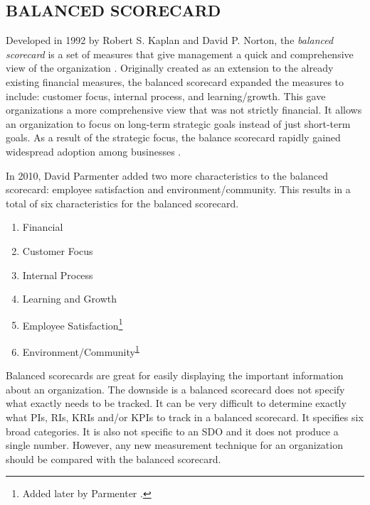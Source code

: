 \documentclass[SDSUThesis.tex]{subfiles}
\begin{document}
    \subsection{BALANCED SCORECARD}
    \label{sec:bsc}
    
        Developed in 1992 by Robert S. Kaplan and David P. Norton, the 
        \textit{balanced scorecard}  is a set of measures that
        give management a quick and comprehensive view of the
        organization \cite{kaplan1992}.  Originally created as an
        extension to the already existing financial measures, the
        balanced scorecard expanded the measures to include: 
        customer focus, internal process, and learning/growth. 
        This gave organizations a more comprehensive view that was
        not strictly financial.  It allows an organization to focus
        on long-term strategic goals instead of just short-term goals.
        As a result of the strategic focus, the balance scorecard
        rapidly gained widespread adoption
        among businesses \cite{Kaplan2007}.  
        
        In 2010, David Parmenter \cite{parmenter2010} added two more
        characteristics to the balanced scorecard: employee satisfaction
        and environment/community.  This results in a total of six 
        characteristics for the balanced scorecard.
        \begin{enumerate}
          \item Financial 
          \item Customer Focus
          \item Internal Process
          \item Learning and Growth
          \item Employee Satisfaction\footnote{\label{ft:bsc} Added 
          later by Parmenter \cite{parmenter2010}. }
          \item Environment/Community\textsuperscript{\ref{ft:bsc}}
        \end{enumerate}
        
        Balanced scorecards are great for easily displaying the 
        important information about
        an organization.  The downside is a balanced scorecard does not specify what
        exactly needs to be tracked. It can be very difficult to determine exactly
        what PIs, RIs, KRIs and/or KPIs to track in a balanced scorecard. 
        It specifies six broad categories.
        It is also not specific to an SDO and 
        it does not produce a single number.  However, any new measurement
        technique for an organization should be compared with the balanced
        scorecard.  
\end{document}
